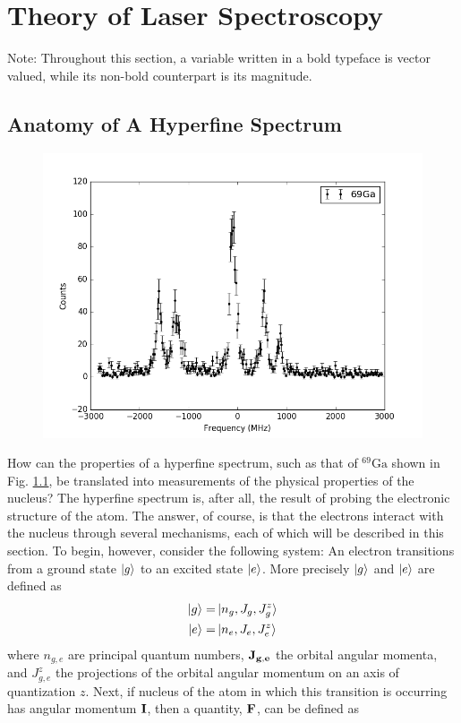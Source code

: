 \documentclass[12pt,a4paper,margin=1in]{book}
\begin{document}
\chapter{Theory of Laser Spectroscopy}
Note: Throughout this section, a variable written in a bold typeface is vector valued, while its non-bold counterpart is its magnitude. 
\section{Anatomy of A Hyperfine Spectrum}
\begin{figure}[h]
\includegraphics[width=\textwidth]{Graphics/ga69.png}
\label{ga69}
\end{figure}
How can the properties of a hyperfine spectrum, such as that of $^{69}\mathrm{Ga}$ shown in Fig. \ref{ga69}, be translated into measurements of the physical properties of the nucleus? The hyperfine spectrum is, after all, the result of probing the electronic structure of the atom. The answer, of course, is that the electrons interact with the nucleus through several mechanisms, each of which will be described in this section. To begin, however, consider the following system: An electron transitions from a ground state $\ket{g}$ to an excited state $\ket{e}$. More precisely $\ket{g}$ and $\ket{e}$ are defined as 
\begin{align}
\ket{g} =& \ket{n_g,J_g,J_g^z}\\
\ket{e} =& \ket{n_e,J_e,J_e^z}
\end{align}
where $n_{g,e}$ are principal quantum numbers, $\bf{J_{g,e}}$ the orbital angular momenta, and $J_{g,e}^z$ the projections of the orbital angular momentum on an axis of quantization $z$. Next, if nucleus of the atom in which this transition is occurring has angular momentum $\bf{I}$, then a quantity, $\bf{F}$, can be defined as 
\end{document}
